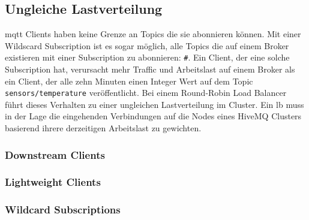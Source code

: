 \subsection{Ungleiche Lastverteilung}
\ac{mqtt} Clients haben keine Grenze an Topics die sie abonnieren können. Mit einer Wildscard Subscription ist es sogar möglich, alle Topics die auf einem Broker existieren mit einer Subscription zu abonnieren: \verb|#|. Ein Client, der eine solche Subscription hat, verursacht mehr Traffic und Arbeitslast auf einem Broker als ein Client, der alle zehn Minuten einen Integer Wert auf dem Topic \verb|sensors/temperature| veröffentlicht.
Bei einem Round-Robin Load Balancer führt dieses Verhalten zu einer ungleichen Lastverteilung im Cluster. Ein \ac{lb} muss in der Lage die eingehenden Verbindungen auf die Nodes eines HiveMQ Clusters basierend ihrere derzeitigen Arbeitslast zu gewichten.

\subsubsection{Downstream Clients}
\subsubsection{Lightweight Clients}
\subsubsection{Wildcard Subscriptions}

\begin{comment}
- Describe insufficiencies your project or thesis aims at. Example: "The automated parts of the claim handling process are susceptible to changes. Each change requires lots of man-ual steps in order to deploy these changes into production."
- Do not take the term "problem" too literal. Sometimes, your project or thesis just aims at im-proving a good status quo or pursues new waysand opportunities that arise due to new technological advances or trends. In this case, describe the status quo and where the op-portunities for improvement are.
- Exemplify things! Describe the problem / status quo by means of a specific scenario with concrete steps, concrete input and output data, etc., supported by expressive figures. Do not be afraid that the reader might think that your solution just works for that particular sce-nario. In general, readers can abstract from concrete details much easier that to envisionconcrete scenarios by interpreting overly generic, vague, meandering text passages. (More-over, writing in vague terms also leaves the impression that the writer either did not under-stand the problem for him- or herself or tries to blow up mundane issues.)
\end{comment}
